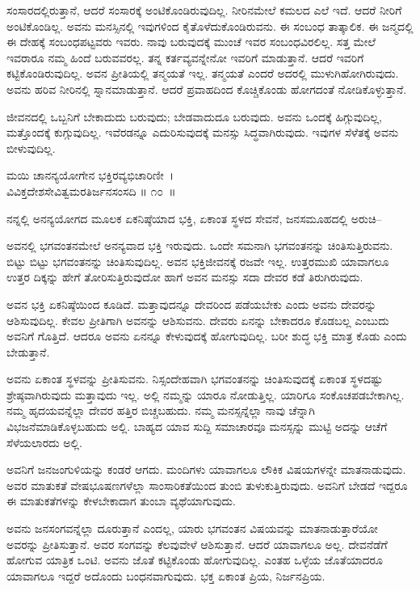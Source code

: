 ಸಂಸಾರದಲ್ಲಿರುತ್ತಾನೆ, ಆದರೆ ಸಂಸಾರಕ್ಕೆ ಅಂಟಿಕೊಂಡಿರುವುದಿಲ್ಲ. ನೀರಿನಮೇಲೆ ಕಮಲದ ಎಲೆ ಇದೆ. ಆದರೆ ನೀರಿಗೆ ಅಂಟಿಕೊಂಡಿಲ್ಲ. ಅವನು ಮನಸ್ಸಿನಲ್ಲಿ ಇವುಗಳಿಂದ ಕೈತೊಳೆದು\-ಕೊಂಡಿರುವನು. ಈ ಸಂಬಂಧ ತಾತ್ಕಾಲಿಕ. ಈ ಜನ್ಮದಲ್ಲಿ ಈ ದೇಹಕ್ಕೆ ಸಂಬಂಧಪಟ್ಟವರು ಇವರು. ನಾವು ಬರುವುದಕ್ಕೆ ಮುಂಚೆ ಇವರ ಸಂಬಂಧವಿರಲಿಲ್ಲ. ಸತ್ತ ಮೇಲೆ ಇವರಾರೂ ನಮ್ಮ ಹಿಂದೆ ಬರುವವರಲ್ಲ. ತನ್ನ ಕರ್ತವ್ಯವನ್ನೇನೋ ಇವರಿಗೆ ಮಾಡುತ್ತಾನೆ. ಆದರೆ ಇವರಿಗೆ ಕಟ್ಟಿಕೊಂಡಿರುವುದಿಲ್ಲ. ಅವನ ಪ್ರೀತಿಯಲ್ಲಿ ತನ್ಮಯತೆ ಇಲ್ಲ. ತನ್ಮಯತೆ ಎಂದರೆ ಅದರಲ್ಲಿ ಮುಳುಗಿಹೋಗಿರುವುದು. ಅವನು ಹರಿವ ನೀರಿನಲ್ಲಿ ಸ್ನಾನಮಾಡುತ್ತಾನೆ. ಆದರೆ ಪ್ರವಾಹದಿಂದ ಕೊಚ್ಚಿಕೊಂಡು ಹೋಗದಂತೆ ನೋಡಿಕೊಳ್ಳುತ್ತಾನೆ.

ಜೀವನದಲ್ಲಿ ಒಬ್ಬನಿಗೆ ಬೇಕಾದುದು ಬರುವುದು; ಬೇಡವಾದುದೂ ಬರುವುದು. ಅವನು ಒಂದಕ್ಕೆ ಹಿಗ್ಗುವುದಿಲ್ಲ, ಮತ್ತೊಂದಕ್ಕೆ ಕುಗ್ಗುವುದಿಲ್ಲ. ಇವೆರಡನ್ನೂ ಎದುರಿಸುವುದಕ್ಕೆ ಮನಸ್ಸು ಸಿದ್ಧವಾಗಿರುವುದು. ಇವುಗಳ ಸೆಳೆತಕ್ಕೆ ಅವನು ಬೀಳುವುದಿಲ್ಲ.

\begin{shloka}
ಮಯಿ ಚಾನನ್ಯಯೋಗೇನ ಭಕ್ತಿರವ್ಯಭಿಚಾರಿಣೀ~।\\ವಿವಿಕ್ತದೇಶಸೇವಿತ್ವಮರತಿರ್ಜನಸಂಸದಿ \hfill॥ ೧೦~॥
\end{shloka}

\begin{artha}
ನನ್ನಲ್ಲಿ ಅನನ್ಯಯೋಗದ ಮೂಲಕ ಏಕನಿಷ್ಠೆಯಾದ ಭಕ್ತಿ, ಏಕಾಂತ ಸ್ಥಳದ ಸೇವನೆ, ಜನಸಮೂಹದಲ್ಲಿ ಅರುಚಿ–
\end{artha}

ಅವನಲ್ಲಿ ಭಗವಂತನಮೇಲೆ ಅನನ್ಯವಾದ ಭಕ್ತಿ ಇರುವುದು. ಒಂದೇ ಸಮನಾಗಿ ಭಗವಂತನನ್ನು ಚಿಂತಿಸುತ್ತಿರುವನು. ಬಿಟ್ಟು ಬಿಟ್ಟು ಭಗವಂತನನ್ನು ಚಿಂತಿಸುವುದಿಲ್ಲ. ಅವನ ಭಕ್ತಿಜೀವನಕ್ಕೆ ರಜವೇ ಇಲ್ಲ. ಉತ್ತರಮುಖಿ ಯಾವಾಗಲೂ ಉತ್ತರ ದಿಕ್ಕನ್ನು ಹೇಗೆ ತೋರಿಸುತ್ತಿರುವುದೋ ಹಾಗೆ ಅವನ ಮನಸ್ಸು ಸದಾ ದೇವರ ಕಡೆ ತಿರುಗಿರುವುದು.

ಅವನ ಭಕ್ತಿ ಏಕನಿಷ್ಠೆಯಿಂದ ಕೂಡಿದೆ. ಮತ್ತಾವುದನ್ನೂ ದೇವರಿಂದ ಪಡೆಯಬೇಕು ಎಂದು ಅವನು ದೇವರನ್ನು ಆಶಿಸುವುದಿಲ್ಲ. ಕೇವಲ ಪ್ರೀತಿಗಾಗಿ ಅವನನ್ನು ಆಶಿಸುವನು. ದೇವರು ಏನನ್ನು ಬೇಕಾದರೂ ಕೊಡಬಲ್ಲ ಎಂಬುದು ಅವನಿಗೆ ಗೊತ್ತಿದೆ. ಆದರೂ ಅವನು ಏನನ್ನೂ ಕೇಳುವುದಕ್ಕೆ ಹೋಗುವುದಿಲ್ಲ. ಬರೀ ಶುದ್ಧ ಭಕ್ತಿ ಮಾತ್ರ ಕೊಡು ಎಂದು ಬೇಡುತ್ತಾನೆ.

ಅವನು ಏಕಾಂತ ಸ್ಥಳವನ್ನು ಪ್ರೀತಿಸುವನು. ನಿಸ್ಸಂದೇಹವಾಗಿ ಭಗವಂತನನ್ನು ಚಿಂತಿಸುವುದಕ್ಕೆ ಏಕಾಂತ ಸ್ಥಳದಷ್ಟು ಶ್ರೇಷ್ಠವಾಗಿರುವುದು ಮತ್ತಾವುದು ಇಲ್ಲ. ಅಲ್ಲಿ ನಮ್ಮನ್ನು ಯಾರೂ ನೋಡುತ್ತಿಲ್ಲ. ಯಾರಿಗೂ ಸಂಕೊಚಪಡಬೇಕಾಗಿಲ್ಲ. ನಮ್ಮ ಹೃದಯವನ್ನೆಲ್ಲಾ ದೇವರ ಹತ್ತಿರ ಬಿಚ್ಚಬಹುದು. ನಮ್ಮ ಮನಸ್ಸನ್ನೆಲ್ಲಾ ನಾವು ಚೆನ್ನಾಗಿ ವಿಭಜನೆಮಾಡಿಕೊಳ್ಳಬಹುದು ಅಲ್ಲಿ. ಬಾಹ್ಯದ ಯಾವ ಸುದ್ದಿ ಸಮಾಚಾರವೂ ಮನಸ್ಸನ್ನು ಮುಟ್ಟಿ ಅದನ್ನು ಆಚೆಗೆ ಸೆಳೆಯಲಾರದು ಅಲ್ಲಿ.

ಅವನಿಗೆ ಜನಜಂಗುಳಿಯನ್ನು ಕಂಡರೆ ಆಗದು. ಮಂದಿಗಳು ಯಾವಾಗಲೂ ಲೌಕಿಕ ವಿಷಯಗಳನ್ನೇ ಮಾತನಾಡುವುದು. ಅವರ ಮಾತುಕತೆ ವೇಷಭೂಷಣಗಳೆಲ್ಲಾ ಸಾಂಸಾರಿಕತೆಯಿಂದ ತುಂಬಿ ತುಳುಕುತ್ತಿರುವುದು. ಅವನಿಗೆ ಬೇಡದೆ ಇದ್ದರೂ ಈ ಮಾತುಕತೆಗಳನ್ನು ಕೇಳಬೇಕಾದಾಗ ತುಂಬಾ ವ್ಯಥೆಯಾಗುವುದು.

ಅವನು ಜನಸಂಗವನ್ನೆಲ್ಲಾ ದೂರುತ್ತಾನೆ ಎಂದಲ್ಲ, ಯಾರು ಭಗವಂತನ ವಿಷಯವನ್ನು ಮಾತನಾಡುತ್ತಾರೆಯೋ ಅವರನ್ನು ಪ್ರೀತಿಸುತ್ತಾನೆ. ಅವರ ಸಂಗವನ್ನು ಕೆಲವುವೇಳೆ ಆಶಿಸುತ್ತಾನೆ. ಆದರೆ ಯಾವಾಗಲೂ ಅಲ್ಲ. ದೇವನೆಡೆಗೆ ಹೋಗುವ ಯಾತ್ರಿಕ ಒಂಟಿ. ಅವನು ಜೊತೆ ಕಟ್ಟಿಕೊಂಡು ಹೋಗುವುದಿಲ್ಲ. ಎಂತಹ ಒಳ್ಳೆಯ ಜೊತೆಯಾದರೂ ಯಾವಾಗಲೂ ಇದ್ದರೆ ಅದೊಂದು ಬಂಧನವಾಗುವುದು. ಭಕ್ತ ಏಕಾಂತ ಪ್ರಿಯ, ನಿರ್ಜನಪ್ರಿಯ.\enginline{}

